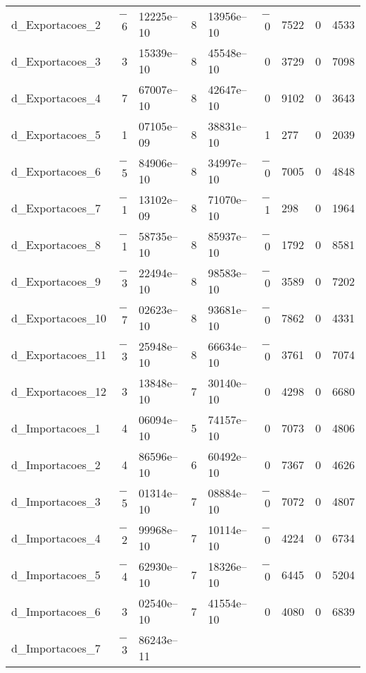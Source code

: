 \documentclass[11pt]{article}
\begin{document}
\begin{center}
\begin{tabular}{lr@{,}lr@{,}lr@{,}lr@{,}l}
d\_Exportacoes\_2 &
  $-$6&12225\textrm{e--10} &
    8&13956\textrm{e--10} &
      $-$0&7522 &
        0&4533 \\
d\_Exportacoes\_3 &
  3&15339\textrm{e--10} &
    8&45548\textrm{e--10} &
      0&3729 &
        0&7098 \\
d\_Exportacoes\_4 &
  7&67007\textrm{e--10} &
    8&42647\textrm{e--10} &
      0&9102 &
        0&3643 \\
d\_Exportacoes\_5 &
  1&07105\textrm{e--09} &
    8&38831\textrm{e--10} &
      1&277 &
        0&2039 \\
d\_Exportacoes\_6 &
  $-$5&84906\textrm{e--10} &
    8&34997\textrm{e--10} &
      $-$0&7005 &
        0&4848 \\
d\_Exportacoes\_7 &
  $-$1&13102\textrm{e--09} &
    8&71070\textrm{e--10} &
      $-$1&298 &
        0&1964 \\
d\_Exportacoes\_8 &
  $-$1&58735\textrm{e--10} &
    8&85937\textrm{e--10} &
      $-$0&1792 &
        0&8581 \\
d\_Exportacoes\_9 &
  $-$3&22494\textrm{e--10} &
    8&98583\textrm{e--10} &
      $-$0&3589 &
        0&7202 \\
d\_Exportacoes\_10 &
  $-$7&02623\textrm{e--10} &
    8&93681\textrm{e--10} &
      $-$0&7862 &
        0&4331 \\
d\_Exportacoes\_11 &
  $-$3&25948\textrm{e--10} &
    8&66634\textrm{e--10} &
      $-$0&3761 &
        0&7074 \\
d\_Exportacoes\_12 &
  3&13848\textrm{e--10} &
    7&30140\textrm{e--10} &
      0&4298 &
        0&6680 \\
d\_Importacoes\_1 &
  4&06094\textrm{e--10} &
    5&74157\textrm{e--10} &
      0&7073 &
        0&4806 \\
d\_Importacoes\_2 &
  4&86596\textrm{e--10} &
    6&60492\textrm{e--10} &
      0&7367 &
        0&4626 \\
d\_Importacoes\_3 &
  $-$5&01314\textrm{e--10} &
    7&08884\textrm{e--10} &
      $-$0&7072 &
        0&4807 \\
d\_Importacoes\_4 &
  $-$2&99968\textrm{e--10} &
    7&10114\textrm{e--10} &
      $-$0&4224 &
        0&6734 \\
d\_Importacoes\_5 &
  $-$4&62930\textrm{e--10} &
    7&18326\textrm{e--10} &
      $-$0&6445 &
        0&5204 \\
d\_Importacoes\_6 &
  3&02540\textrm{e--10} &
    7&41554\textrm{e--10} &
      0&4080 &
        0&6839 \\
d\_Importacoes\_7 &
  $-$3&86243\textrm{e--11} &

\end{tabular}
\end{center}
\end{document}
